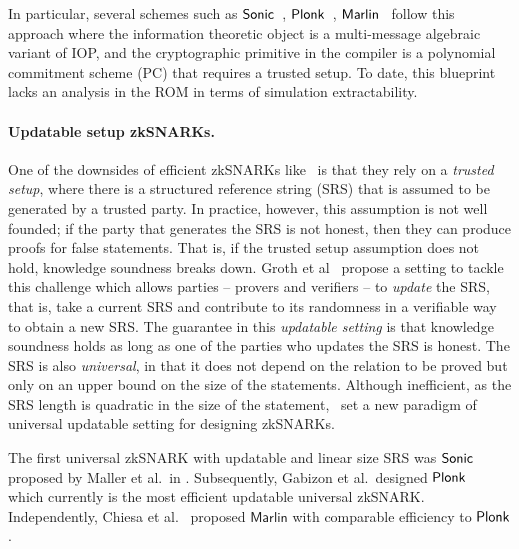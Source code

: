 %

In particular, several schemes such as
${\textnormal{\textsf{Sonic}}}$~\cite{CCS:MBKM19}, $\textnormal{\textsf{Plonk}}$~\cite{EPRINT:GabWilCio19}, ${\textnormal{\textsf{Marlin}}}$~\cite{EC:CHMMVW20} 
follow this approach where the information theoretic object is a multi-message algebraic variant of IOP, and the cryptographic primitive in the compiler is a polynomial commitment scheme (PC) that requires a trusted setup. To date, this blueprint lacks an analysis in the ROM in terms of simulation extractability.


\paragraph{Updatable setup zkSNARKs.}
One of the downsides of efficient zkSNARKs like~\cite{AC:Groth10a,TCC:Lipmaa12,EC:GGPR13,SP:PHGR13,AC:Lipmaa13,AC:DFGK14,EC:Groth16} is that they rely on a \textit{trusted setup}, where there is a structured reference string (SRS) that is assumed to be generated by a trusted party. In practice, however, this assumption is not well founded; if the party that generates the SRS is not honest, then they can produce proofs for false statements. That is, if the trusted setup assumption does not hold, knowledge soundness breaks down.
Groth et al~\cite{C:GKMMM18} propose a setting to tackle this challenge which allows parties -- provers and verifiers -- to \emph{update} the SRS, that is, take a current SRS and contribute to its randomness in a verifiable way to obtain a new SRS. The guarantee in this \textit{updatable setting} is that knowledge soundness holds as long as one of the parties who updates the SRS is honest. The SRS is also \emph{universal}, in that it does not depend on the relation to be proved but only on an upper bound on the size of the statements.
Although inefficient, as the SRS length is quadratic in the size of the statement,~\cite{C:GKMMM18} set a new
paradigm of universal updatable setting for designing zkSNARKs.

The first universal zkSNARK with updatable and linear size SRS was
${\textnormal{\textsf{Sonic}}}$ proposed by Maller et al.~in \cite{CCS:MBKM19}. Subsequently, Gabizon et
al.~designed $\textnormal{\textsf{Plonk}}$~\cite{EPRINT:GabWilCio19} which currently is the
most efficient updatable universal zkSNARK. Independently, Chiesa et
al.~\cite{EC:CHMMVW20} proposed $\textsf{Marlin}$ with comparable efficiency to
$\textnormal{\textsf{Plonk}}$.

